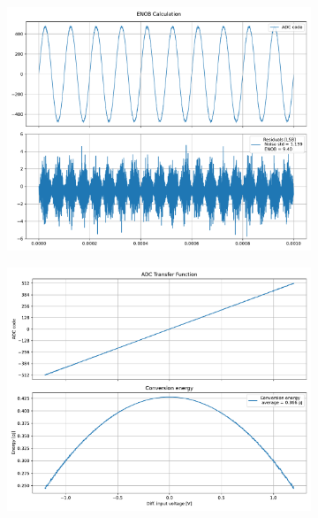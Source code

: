 \documentclass[varwidth]{standalone}
\begin{document}
\begin{figure}
\begin{subfigure}{0.32\textwidth}
    \includegraphics[width=\textwidth]{behavioral_10b_refnoise_enob.pdf}
\end{subfigure}
\begin{subfigure}{0.32\textwidth}
    \begin{table}
    \let\center\empty
    \let\endcenter\relax
    \centering
    \resizebox{0.3\width}{!}{}
    \end{table}
    \includegraphics[width=\textwidth]{behavioral_10b_refnoise_energy.pdf}
\end{subfigure}
\end{figure}
\end{document}
